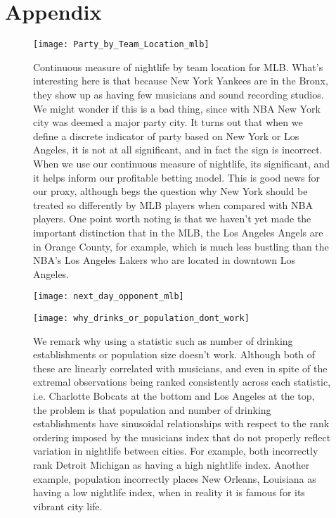 \documentclass[letterpaper,12pt]{article}
\begin{document}



\section{Appendix}

\begin{figure}   
  \centering
  \hspace{-55pt}
  \label{fig: party by team location mlb}
  \texttt{[image: Party\_by\_Team\_Location\_mlb]}
  \caption{Continuous measure of nightlife by team location for MLB. What's interesting here is that because New York Yankees are in the Bronx, they show up as having few musicians and sound recording studios. We might wonder if this is a bad thing, since with NBA New York city was deemed a major party city. It turns out that when we define a discrete indicator of party based on New York or Los Angeles, it is not at all significant, and in fact the sign is incorrect. When we use our continuous
 measure of nightlife, its significant, and it helps inform our profitable betting model.
This is good news for our proxy, although begs the question why New York should be treated so differently by MLB players when compared with NBA players. One point worth noting is that we haven't yet made the important distinction that in the MLB, the Los Angeles Angels are in Orange County, for example, which is much less bustling than the NBA's  Los Angeles Lakers who are located in downtown Los Angeles.}
\end{figure}

\begin{figure}   
  \centering
  \hspace{-55pt}
  \label{fig: next day opponent mlb}
  \texttt{[image: next\_day\_opponent\_mlb]} 
\end{figure}

\begin{sidewaysfigure}   
  \centering
  \label{fig: why drinks or pop dont work}
  \texttt{[image: why\_drinks\_or\_population\_dont\_work]} 
  \caption{We remark why using a statistic such as number of drinking establishments or 
    population size doesn't work. Although both of these are linearly correlated with musicians, 
    and even in spite of the extremal observations being ranked consistently across each statistic, 
    i.e. Charlotte Bobcats at the bottom and Los Angeles at the top,  
    the problem is that population and number of drinking establishments have sinusoidal 
    relationships with respect to the rank ordering imposed by the musicians index 
    that do not properly reflect variation in nightlife between cities. For example, both 
    incorrectly rank Detroit Michigan as having a high nightlife index. Another example, population incorrectly places New Orleans, Louisiana as having a low nightlife index, when in reality it is famous for its vibrant city life.}
\end{sidewaysfigure}
\end{document}
